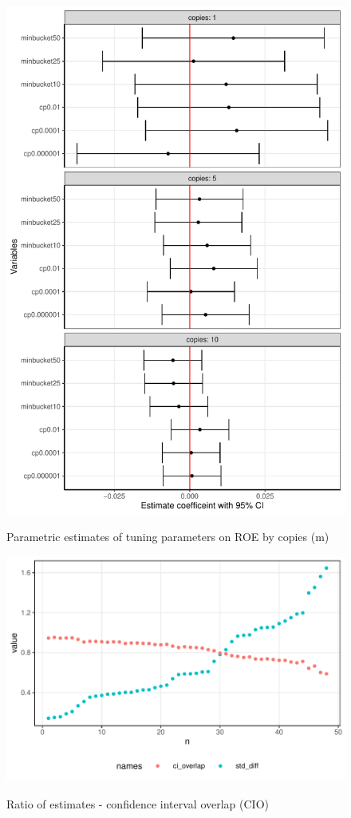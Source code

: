 \documentclass[12pt]{article}
\begin{document}
\begin{figure}[!h]
    \centering
    \caption{Parametric estimates of tuning parameters on ROE by copies (m)}
    \includegraphics{../graphs/synthpop/graph_synthpop_roc_univar_facet.pdf}
    \label{graph_synthpop_roc_univar_facet}
\end{figure}

\begin{figure}[!h]
    \centering
    \caption{Ratio of estimates - confidence interval overlap (CIO)}
    \includegraphics{../graphs/synthpop/graph_synthpop_cio_raw.pdf}
    \label{graph_synthpop_cio}
\end{figure}
\end{document}
